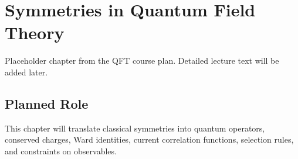 \chapter{Symmetries in Quantum Field Theory}

\begin{remarkbox}
Placeholder chapter from the QFT course plan. Detailed lecture text will be added later.
\end{remarkbox}

\section{Planned Role}

This chapter will translate classical symmetries into quantum operators, conserved charges, Ward identities, current correlation functions, selection rules, and constraints on observables.
